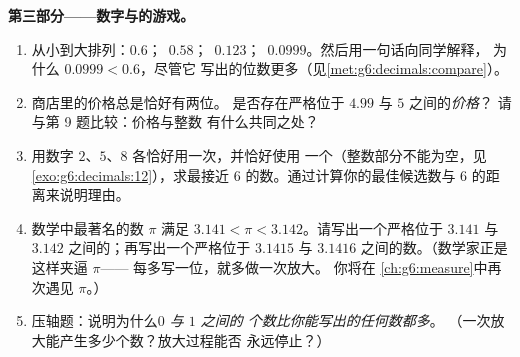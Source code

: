 \begin{problem}
\medskip
\noindent\textbf{第三部分——数字与的游戏。}
\begin{enumerate}[resume]
  \item 从小到大排列：$0.6$；\ $0.58$；\
        $0.123$；\ $0.0999$。然后用一句话向同学解释，
        为什么 $0.0999 < 0.6$，尽管它
        写出的位数更多（见\cref{met:g6:decimals:compare}）。
  \item 商店里的价格总是恰好有两位。
        是否存在严格位于 $4.99$ 与 $5$ 之间的\emph{价格}？
        请与第 9 题比较：价格与整数
        有什么共同之处？
  \item 用数字 $2$、$5$、$8$ 各恰好用一次，并恰好使用
        一个（整数部分不能为空，见
        \cref{exo:g6:decimals:12}），求最接近
        $6$ 的数。通过计算你的最佳候选数与
        $6$ 的距离来说明理由。
  \item 数学中最著名的数 $\pi$ 满足
        $3.141 < \pi < 3.142$。请写出一个严格位于
        $3.141$ 与 $3.142$ 之间的；再写出一个严格位于
        $3.1415$ 与 $3.1416$ 之间的数。（数学家正是这样夹逼 $\pi$——
        每多写一位，就多做一次放大。
        你将在
        \cref{ch:g6:measure}中再次遇见 $\pi$。）
  \item 压轴题：说明为什么\emph{$0$ 与 $1$ 之间的
        个数比你能写出的任何数都多}。
        （一次放大能产生多少个数？放大过程能否
        永远停止？）
\end{enumerate}
\end{problem}
